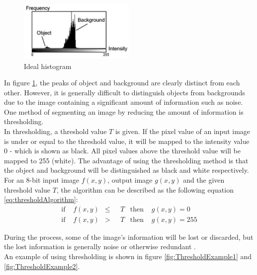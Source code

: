 \begin{figure}[H]
	\centering
	\includegraphics[width=0.5\textwidth]{8Misc/Pictures/Introduction/moeslund2012histogramThres.jpg}
	\caption{Ideal histogram \citep[ Chapter~4.4]{book:Moeslund}}
	\label{fig:IdealHistogramThreshold}
\end{figure}

In figure \ref{fig:IdealHistogramThreshold}, the peaks of object and background are clearly distinct from each other. However, it is generally difficult to distinguish objects from backgrounds due to the image containing a significant amount of information such as noise. One method of segmenting an image by reducing the amount of information is thresholding. \\

In thresholding, a threshold value $T$ is given. If the pixel value of an input image is under or equal to the threshold value, it will be mapped to the intensity value 0 - which is shown as black. All pixel values above the threshold value will be mapped to 255 (white). The advantage of using the thresholding method is that the object and background will be distinguished as black and white respectively. For an 8-bit input image $f(x,y)$, output image $g(x,y)$ and the given threshold value $T$, the algorithm can be described as the following equation \ref{eq:thresholdAlgorithm}:
\begin{equation}
\begin{aligned}
\text{if } & f(x,y) &\leq & \text{ } T & \text{then } & g(x,y) = 0 \\   
\text{if } & f(x,y) & > & \text{ } T & \text{then } & g(x,y) = 255
\end{aligned}
\label{eq:thresholdAlgorithm}
\end{equation}

During the process, some of the image's information will be lost or discarded, but the lost information is generally noise or otherwise redundant \citep{book:Moeslund}. \\

An example of using thresholding is shown in figure \ref{fig:ThresholdExample1} and \ref{fig:ThresholdExample2}.

